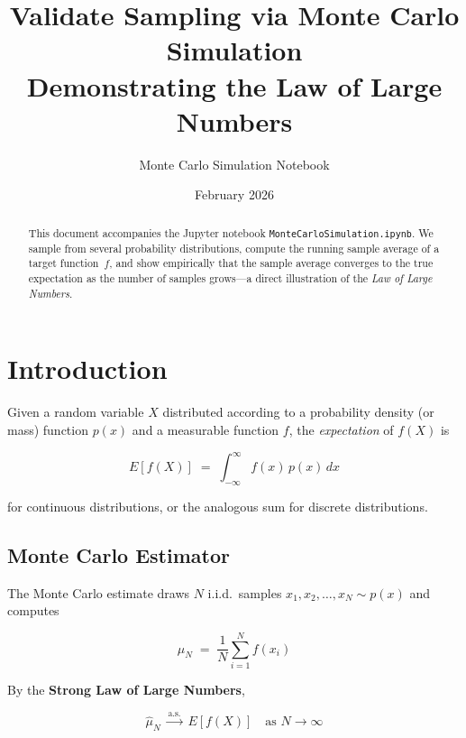 \documentclass[12pt, a4paper]{article}
\title{%
    \textbf{Validate Sampling via Monte Carlo Simulation}\\[6pt]
    \large Demonstrating the Law of Large Numbers
}
\author{Monte Carlo Simulation Notebook}
\date{February 2026}
\begin{document}
\maketitle

\begin{abstract}
This document accompanies the Jupyter notebook
\texttt{MonteCarloSimulation.ipynb}.  We sample from several
probability distributions, compute the running sample average of a
target function~$f$, and show empirically that the sample average
converges to the true expectation as the number of samples grows---a
direct illustration of the \emph{Law of Large Numbers}.
\end{abstract}

\tableofcontents
\newpage

\section{Introduction}
\label{sec:intro}

Given a random variable $X$ distributed according to a probability
density (or mass) function $p(x)$ and a measurable function $f$, the
\emph{expectation} of $f(X)$ is

\begin{equation}
    E[f(X)] \;=\; \int_{-\infty}^{\infty} f(x)\, p(x)\, dx
    \label{eq:expectation}
\end{equation}

\noindent for continuous distributions, or the analogous sum for
discrete distributions.

\subsection{Monte Carlo Estimator}

The Monte Carlo estimate draws $N$ i.i.d.\ samples
$x_1, x_2, \ldots, x_N \sim p(x)$ and computes

\begin{equation}
    \hat{\mu}_N \;=\; \frac{1}{N} \sum_{i=1}^{N} f(x_i)
    \label{eq:mc_estimator}
\end{equation}

By the \textbf{Strong Law of Large Numbers},

\begin{equation}
    \hat{\mu}_N \;\xrightarrow{\text{a.s.}}\; E[f(X)]
    \quad\text{as } N \to \infty
    \label{eq:lln}
\end{equation}
\end{document}
